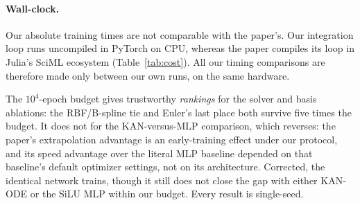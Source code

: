 \paragraph{Wall-clock.} Our absolute training times are not comparable with
the paper's. Our integration loop runs uncompiled in PyTorch on CPU,
whereas the paper compiles its loop in Julia's SciML ecosystem
(Table~\ref{tab:cost}). All our timing comparisons are therefore made only
between our own runs, on the same hardware.

\begin{keypoint}
The $10^4$-epoch budget gives trustworthy \emph{rankings} for the solver and
basis ablations: the RBF/B-spline tie and Euler's last place both survive
five times the budget. It does not for the KAN-versus-MLP comparison, which
reverses: the paper's extrapolation advantage is an early-training effect
under our protocol, and its speed advantage over the literal MLP baseline
depended on that baseline's default optimizer settings, not on its
architecture. Corrected, the identical network trains, though it still does
not close the gap with either KAN-ODE or the SiLU MLP within our budget.
Every result is single-seed.
\end{keypoint}
